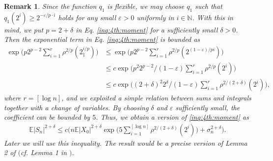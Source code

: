 \documentclass[11pt,a4,leqno]{amsart}
\newtheorem{remark}[lemma]{Remark}
\newcommand{\N}{\mathbb{N}}
\newcommand{\vep}{\varepsilon}
\newcommand{\E }{{\mathbb E}}
\newcommand{\1}{{\mathbf 1}}
\begin{document}
\begin{remark}
\label{rem:for:lem:inq:4th:moment}
Since the function $q_1$ is flexible, we may choose $q_1$ such that $q_1(2^i) \ge 2^{-\vep/p \cdot i}$ holds for 
any small $\vep>0$ uniformly in $i\in \N$. With this in mind, we put $p=2+\delta$ in Eq. \eqref{inq:4th:moment}
for a sufficiently small $\delta>0$. Then the exponential term in Eq. \eqref{inq:4th:moment} is bounded 
as 
\begin{align*}
\exp \Big(
p 2^{p-2} \sum_{i=1}^r \rho^{2/p}(2_\ddag^{i/p}) 
\Big) &\le \exp \Big(
p 2^{p-2} \sum_{i=1}^r \rho^{2/p}(2^{(1-\vep)/p i})
\Big) \\
& \le c \exp \Big(
p^2 2^{p-2}/(1-\vep) \sum_{i=1}^r \rho^{2/p}(2^{ i})
\Big) \\
& \le c \exp \Big(
(2+\delta)^2 2^{\delta}/(1-\vep) \sum_{i=1}^r \rho^{2/(2+\delta)}(2^{ i})
\Big),
\end{align*}
where $r=[\log n]$, and we exploited a simple relation between sums and integrals 
together with a change of variables. By choosing $\delta$ and $\vep$ sufficiently small, the coefficient 
can be bounded by $5$. Thus, we obtain a version of \eqref{inq:4th:moment} as 
\begin{align*}
 \E|S_n|^{2+\delta} \le c \bigg(
n \E|X_0|^{2+\delta} \exp \Big(5 \sum_{i=1}^{[\log n]} \rho^{2/(2+\delta)}(2^{ i})\Big) + \sigma_n^{2+\delta}
\bigg). 
\end{align*}
Later we will use this inequality. 
The result would be a precise version of Lemma 2 of \cite{shao:1989} $($cf. Lemma 1 in \cite{shao:1988}$)$.
\end{remark}
\end{document}
